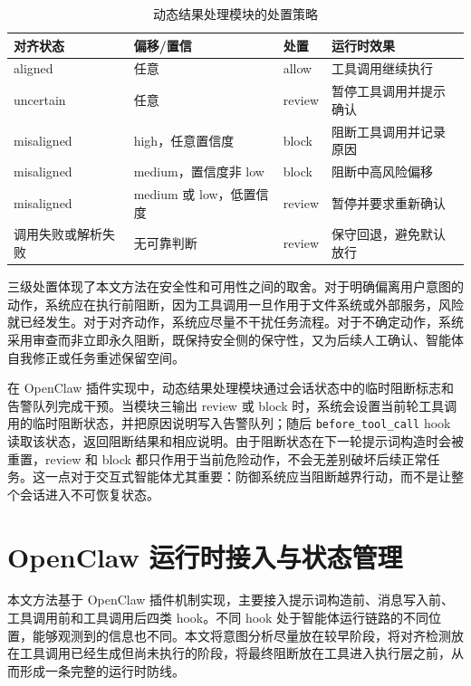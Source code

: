 \begin{table}[htbp]
  \centering
  \caption{动态结果处理模块的处置策略}
  \label{tab:chap04-dynamic-policy}
  \small
  \renewcommand{\arraystretch}{1.25}
  \begin{tabular}{@{}p{}p{}p{}p{}@{}}
    \toprule
    对齐状态 & 偏移/置信 & 处置 & 运行时效果 \\
    \midrule
    aligned &
    任意 &
    allow &
    工具调用继续执行 \\
    uncertain &
    任意 &
    review &
    暂停工具调用并提示确认 \\
    misaligned &
    high，任意置信度 &
    block &
    阻断工具调用并记录原因 \\
    misaligned &
    medium，置信度非 low &
    block &
    阻断中高风险偏移 \\
    misaligned &
    medium 或 low，低置信度 &
    review &
    暂停并要求重新确认 \\
    调用失败或解析失败 &
    无可靠判断 &
    review &
    保守回退，避免默认放行 \\
    \bottomrule
  \end{tabular}
\end{table}

三级处置体现了本文方法在安全性和可用性之间的取舍。对于明确偏离用户意图的动作，系统应在执行前阻断，因为工具调用一旦作用于文件系统或外部服务，风险就已经发生。对于对齐动作，系统应尽量不干扰任务流程。对于不确定动作，系统采用审查而非立即永久阻断，既保持安全侧的保守性，又为后续人工确认、智能体自我修正或任务重述保留空间。

在 OpenClaw 插件实现中，动态结果处理模块通过会话状态中的临时阻断标志和告警队列完成干预。当模块三输出 review 或 block 时，系统会设置当前轮工具调用的临时阻断状态，并把原因说明写入告警队列；随后 \texttt{before\_tool\_call} hook 读取该状态，返回阻断结果和相应说明。由于阻断状态在下一轮提示词构造时会被重置，review 和 block 都只作用于当前危险动作，不会无差别破坏后续正常任务。这一点对于交互式智能体尤其重要：防御系统应当阻断越界行动，而不是让整个会话进入不可恢复状态。

\section{OpenClaw 运行时接入与状态管理}

本文方法基于 OpenClaw 插件机制实现，主要接入提示词构造前、消息写入前、工具调用前和工具调用后四类 hook。不同 hook 处于智能体运行链路的不同位置，能够观测到的信息也不同。本文将意图分析尽量放在较早阶段，将对齐检测放在工具调用已经生成但尚未执行的阶段，将最终阻断放在工具进入执行层之前，从而形成一条完整的运行时防线。

